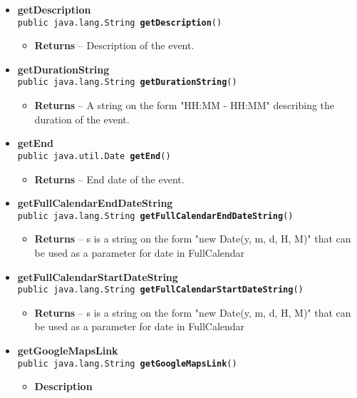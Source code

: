 \documentclass[11pt,a4paper]{report}
\begin{document}
{{{\begin{itemize}
{\begin{itemize}
{A string on the form "d. M Y" describing the date of the event. 
}%
\end{itemize}
}%
\item{ 
{\bf  getDescription}\\
\texttt{public java.lang.String\ {\bf  getDescription}()
\label{is.mpg.ruglan.data.CalEvent.getDescription()}}%
\begin{itemize}
\item{{\bf  Returns} -- 
Description of the event. 
}%
\end{itemize}
}%
\item{ 
{\bf  getDurationString}\\
\texttt{public java.lang.String\ {\bf  getDurationString}()
\label{is.mpg.ruglan.data.CalEvent.getDurationString()}}%
\begin{itemize}
\item{{\bf  Returns} -- 
A string on the form "HH:MM - HH:MM" describing the duration of the event. 
}%
\end{itemize}
}%
\item{ 
{\bf  getEnd}\\
\texttt{public java.util.Date\ {\bf  getEnd}()
\label{is.mpg.ruglan.data.CalEvent.getEnd()}}%
\begin{itemize}
\item{{\bf  Returns} -- 
End date of the event. 
}%
\end{itemize}
}%
\item{ 
{\bf  getFullCalendarEndDateString}\\
\texttt{public java.lang.String\ {\bf  getFullCalendarEndDateString}()
\label{is.mpg.ruglan.data.CalEvent.getFullCalendarEndDateString()}}%
\begin{itemize}
\item{{\bf  Returns} -- 
s is a string on the form "new Date(y, m, d, H, M)" that can be used as a parameter for date in FullCalendar 
}%
\end{itemize}
}%
\item{ 
{\bf  getFullCalendarStartDateString}\\
\texttt{public java.lang.String\ {\bf  getFullCalendarStartDateString}()
\label{is.mpg.ruglan.data.CalEvent.getFullCalendarStartDateString()}}%
\begin{itemize}
\item{{\bf  Returns} -- 
s is a string on the form "new Date(y, m, d, H, M)" that can be used as a parameter for date in FullCalendar 
}%
\end{itemize}
}%
\item{ 
{\bf  getGoogleMapsLink}\\
\texttt{public java.lang.String\ {\bf  getGoogleMapsLink}()
\label{is.mpg.ruglan.data.CalEvent.getGoogleMapsLink()}}%
\begin{itemize}
\item{
{\bf  Description}

}
\end{itemize}}
\end{itemize}}}}
\end{document}
